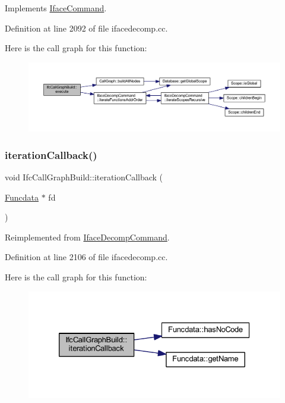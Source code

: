 Implements \mbox{\hyperlink{class_iface_command_af10e29cee2c8e419de6efe9e680ad201}{Iface\+Command}}.



Definition at line 2092 of file ifacedecomp.\+cc.

Here is the call graph for this function\+:
\nopagebreak
\begin{figure}[H]
\begin{center}
\leavevmode
\includegraphics[width=350pt]{class_ifc_call_graph_build_abe1d0338026fa9dd6bcf466e12e0fed1_cgraph}
\end{center}
\end{figure}
\mbox{\label{class_ifc_call_graph_build_a141d9fa5d5f44124c3baadd825a7d658}} 
\subsubsection{\texorpdfstring{iterationCallback()}{iterationCallback()}}
{\footnotesize\ttfamily void Ifc\+Call\+Graph\+Build\+::iteration\+Callback (\begin{DoxyParamCaption}\item[{\mbox{\hyperlink{class_funcdata}{Funcdata}} $\ast$}]{fd }\end{DoxyParamCaption})\hspace{0.3cm}{\ttfamily [virtual]}}



Reimplemented from \mbox{\hyperlink{class_iface_decomp_command_a619d9358a4e77bef66a26f02ea7a6c8e}{Iface\+Decomp\+Command}}.



Definition at line 2106 of file ifacedecomp.\+cc.

Here is the call graph for this function\+:
\nopagebreak
\begin{figure}[H]
\begin{center}
\leavevmode
\includegraphics[width=326pt]{class_ifc_call_graph_build_a141d9fa5d5f44124c3baadd825a7d658_cgraph}
\end{center}
\end{figure}


